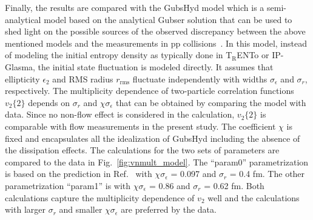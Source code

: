 Finally, the results are compared with the GubsHyd model which is a semi-analytical model based on the analytical Gubser solution that can be used to shed light on the possible sources of the observed discrepancy between the above mentioned models and the measurements in pp collisions~\cite{Taghavi:2019mqz}. In this model, instead of modeling the initial entropy density as typically done in T$_{\text{R}}$ENTo or IP-Glasma, the initial state fluctuation is modeled directly. It assumes that ellipticity $\epsilon_{2}$ and RMS radius $r_{\text{rms}}$ fluctuate independently with widths $\sigma_{\epsilon}$
 and $\sigma_{r}$, respectively. The multiplicity dependence of two-particle correlation functions $v_2\{2\}$ depends on $\sigma_{r}$ and  $\chi\sigma_{\epsilon}$ that can be obtained by comparing the model with data. Since no non-flow effect is considered in the calculation, $v_2\{2\}$ is comparable with flow measurements in the present study. The coefficient $\chi$ is fixed and encapsulates all the idealization of GubsHyd including the absence of the dissipation effects. The calculations for the two sets of parameters are compared
to the data in Fig.~\ref{fig:vnmult_model}. The “param0” parametrization is based on the prediction in Ref.~\cite{Taghavi:2019mqz} with $\chi \sigma_{\epsilon}$ = 0.097 and $\sigma_{r}$ = 0.4 fm. The other parametrization “param1” is with $\chi \sigma_{\epsilon}$ = 0.86 and $\sigma_{r}$ = 0.62 fm. Both calculations capture the multiplicity dependence of $v_2$ well and the calculations with larger $\sigma_{r}$ and smaller $\chi \sigma_{\epsilon}$ are preferred by the data.
 
